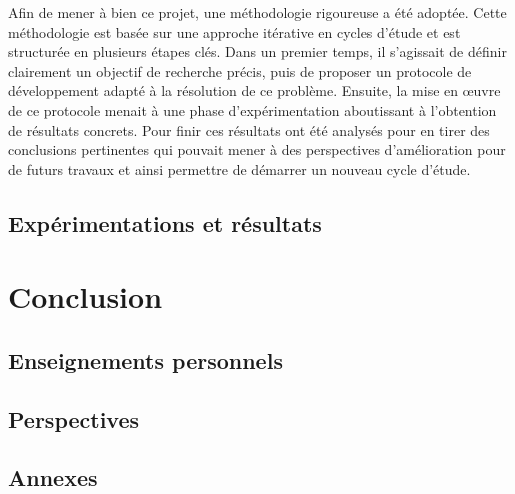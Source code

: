 \documentclass[12pt, letterpaper]{article}
\begin{document}
Afin de mener à bien ce projet, une méthodologie rigoureuse a été adoptée.
Cette méthodologie est basée sur une approche itérative en cycles d'étude et est structurée en plusieurs étapes clés.
Dans un premier temps, il s'agissait de définir clairement un objectif de recherche précis, puis de proposer un protocole de développement adapté à la résolution de ce problème.
Ensuite, la mise en œuvre de ce protocole menait à une phase d'expérimentation aboutissant à l'obtention de résultats concrets.
Pour finir ces résultats ont été analysés pour en tirer des conclusions pertinentes qui pouvait mener à des perspectives d'amélioration pour de futurs travaux et ainsi permettre 
de démarrer un nouveau cycle d'étude.

\subsection{Expérimentations et résultats}

\section{Conclusion}

\subsection{Enseignements personnels}

\subsection{Perspectives}

\subsection{Annexes}
\end{document}
